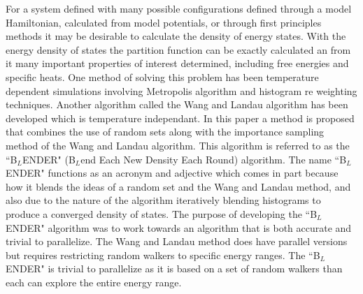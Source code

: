 \documentclass[twocolumn]{article}
\begin{document}
For a system defined with many possible configurations defined through a model Hamiltonian, calculated from model potentials, or through first principles methods it may be desirable to calculate the density of energy states. With the energy density of states the partition function can be exactly calculated an from it many important properties of interest determined, including free energies and specific heats. One method of solving this problem has been temperature dependent simulations involving  Metropolis algorithm and histogram re weighting techniques\cite{landau_MC_simulations}.  Another algorithm called the  Wang and Landau algorithm\cite{WL_phys_rev_lett} has been developed which is temperature independant.  In this paper a method is proposed that combines the use of random sets along with the importance sampling method of the Wang and Landau algorithm. This algorithm is referred to as the ``B$_{L}$ENDER" (B$_{L}$end Each New Density Each Round) algorithm. The name ``B$_{L}$ENDER" functions as an acronym and adjective which comes in part because how it blends the ideas of a random set and the Wang and Landau method, and also due to the nature of the algorithm iteratively blending histograms to produce a converged density of states. The purpose of developing the ``B$_{L}$ENDER" algorithm was to work towards an algorithm that is both accurate and trivial  to parallelize. The Wang and Landau method does have parallel versions but requires restricting random walkers to specific energy ranges. The ``B$_{L}$ENDER" is trivial to parallelize as it is based on a set of random walkers than each can explore the entire energy range. 


\end{document}
